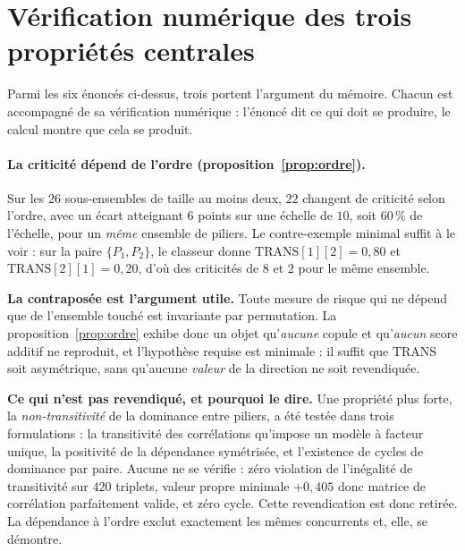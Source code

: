 
\section{Vérification numérique des trois propriétés centrales}

Parmi les six énoncés ci-dessus, trois portent l'argument du mémoire. Chacun est accompagné de
sa vérification numérique : l'énoncé
dit ce qui doit se produire, le calcul montre que cela se produit.

\paragraph{La criticité dépend de l'ordre (proposition~\ref{prop:ordre}).} Sur les $26$
sous-ensembles de taille au moins deux, $22$ changent de criticité selon l'ordre, avec
un écart atteignant $6$ points sur une échelle de $10$, soit $60\,\%$ de l'échelle, pour
un \emph{même} ensemble de piliers. Le contre-exemple minimal suffit à le voir : sur la paire
$\{P_1,P_2\}$, le classeur donne $\mathrm{TRANS}[1][2]=0{,}80$ et $\mathrm{TRANS}[2][1]=0{,}20$,
d'où des criticités de $8$ et $2$ pour le même ensemble.

\begin{cle}
\textbf{La contraposée est l'argument utile.} Toute mesure de risque qui ne dépend que de
l'ensemble touché est invariante par permutation. La proposition~\ref{prop:ordre} exhibe donc un
objet qu'\emph{aucune} copule et qu'\emph{aucun} score additif ne reproduit, et l'hypothèse
requise est minimale : il suffit que $\mathrm{TRANS}$ soit asymétrique, sans qu'aucune
\emph{valeur} de la direction ne soit revendiquée.
\end{cle}

\begin{cle}
\textbf{Ce qui n'est pas revendiqué, et pourquoi le dire.} Une propriété plus forte, la
\emph{non-transitivité} de la dominance entre piliers, a été testée dans trois formulations :
la transitivité des corrélations qu'impose un modèle à facteur unique, la positivité de la
dépendance symétrisée, et l'existence de cycles de dominance par paire. Aucune ne se
vérifie : zéro violation de l'inégalité de transitivité sur $420$ triplets, valeur propre
minimale $+0{,}405$ donc matrice de corrélation parfaitement valide, et zéro cycle. Cette
revendication est donc retirée. La dépendance à l'ordre exclut exactement les mêmes
concurrents et, elle, se démontre.
\end{cle}

